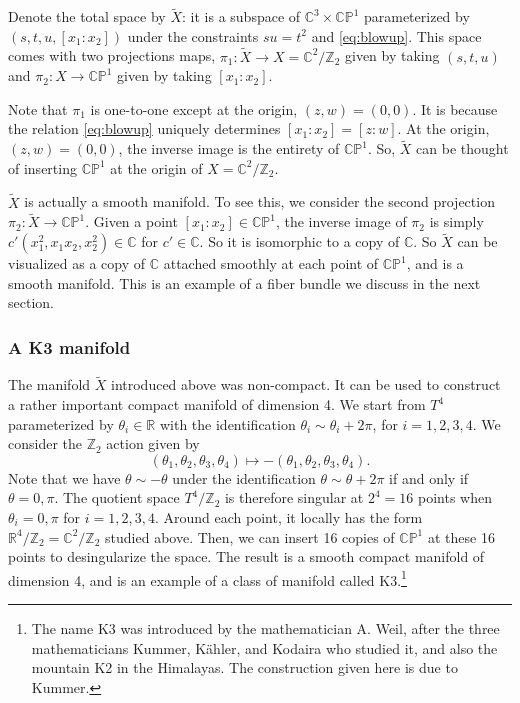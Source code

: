 \documentclass[12pt]{article}
\numberwithin{equation}{section}
\numberwithin{figure}{section}
\theoremstyle{remark}
\def\bC{\mathbb{C}}
\def\bR{\mathbb{R}}
\def\bZ{\mathbb{Z}}
\def\CP{\mathbb{CP}}
\begin{document}
Denote the total space by $\tilde X$: 
it is a subspace of $\bC^3\times \CP^1$ 
parameterized by 
$(s,t,u,[x_1:x_2])$ 
under the constraints $su=t^2$ and \eqref{eq:blowup}.
This space comes with two projections maps, $\pi_1:\tilde X\to X=\bC^2/\bZ_2$ 
given by taking $(s,t,u)$
and $\pi_2:X\to \CP^1$ given by taking $[x_1:x_2]$.

Note that $\pi_1$ is one-to-one except at the origin, $(z,w)=(0,0)$.
It is because the relation \eqref{eq:blowup} uniquely determines $[x_1:x_2]=[z:w]$.
At the origin, $(z,w)=(0,0)$, the inverse image is the entirety of $\CP^1$. 
So, $\tilde X$ can be thought of inserting  $\CP^1$ at the origin of $X=\bC^2/\bZ_2$.

$\tilde X$ is actually a smooth manifold.
To see this, we consider the second projection $\pi_2: \tilde X\to \CP^1$.
Given a point $[x_1:x_2]\in \CP^1$,
the inverse image of $\pi_2$ is simply $c'(x_1^2, x_1 x_2, x_2^2)\in \bC$
for $c'\in \bC$. 
So it is isomorphic to a copy of $\bC$.
So $\tilde X$ can be visualized as a copy of $\bC$ attached smoothly at each point of $\CP^1$,
and is a smooth manifold.
This is an example of a fiber bundle we discuss in the next section.

\subsubsection{A K3 manifold}

The manifold $\tilde X$ introduced above was non-compact. 
It can be used to construct a rather important compact manifold of dimension 4.
We start from $T^4$ parameterized by $\theta_i\in \bR$ with the identification $\theta_i\sim \theta_i+2\pi$, for $i=1,2,3,4$.
We consider the $\bZ_2$ action given by \begin{equation}
  (\theta_1,\theta_2,\theta_3,\theta_4) \mapsto -(\theta_1,\theta_2,\theta_3,\theta_4).
\end{equation}
Note that we have $\theta \sim -\theta$ under the identification $\theta\sim \theta+2\pi$ if and only if $\theta=0,\pi$.
The quotient space $T^4/\bZ_2$ is therefore singular at $2^4=16$ points
when $\theta_i = 0,\pi$ for $i=1,2,3,4$.
Around each point, it locally has the form $\bR^4/\bZ_2 = \bC^2/\bZ_2$ studied above.
Then, we can insert 16 copies of $\CP^1$ at these 16 points to desingularize the space.
The result is a smooth compact manifold of dimension 4, 
and is an example of a class of manifold called K3.\footnote{%
The name K3 was introduced by the mathematician A. Weil, after the three mathematicians 
Kummer, K\"ahler, and Kodaira who studied it, and also the mountain K2 in the Himalayas.
The construction given here is due to Kummer.
}
\end{document}
